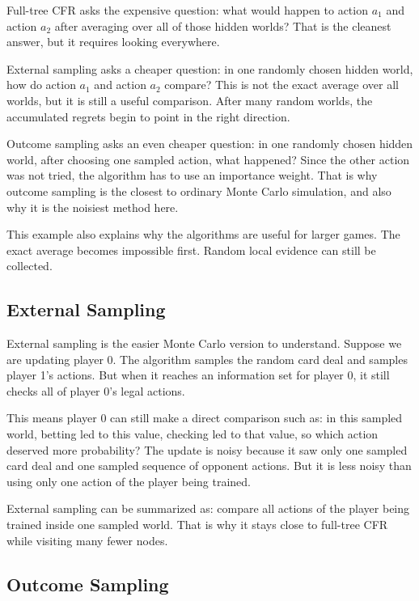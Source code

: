 \documentclass[11pt,reqno,twoside]{article}
\theoremstyle{myThm}
\theoremstyle{myRem}
\theoremstyle{myDef}
\numberwithin{equation}{section}
\begin{document}
Full-tree CFR asks the expensive question: what would happen to action
$a_1$ and action $a_2$ after averaging over all of those hidden worlds? That
is the cleanest answer, but it requires looking everywhere.

External sampling asks a cheaper question: in one randomly chosen hidden
world, how do action $a_1$ and action $a_2$ compare? This is not the exact
average over all worlds, but it is still a useful comparison. After many
random worlds, the accumulated regrets begin to point in the right
direction.

Outcome sampling asks an even cheaper question: in one randomly chosen
hidden world, after choosing one sampled action, what happened? Since the
other action was not tried, the algorithm has to use an importance weight.
That is why outcome sampling is the closest to ordinary Monte Carlo
simulation, and also why it is the noisiest method here.

This example also explains why the algorithms are useful for larger games.
The exact average becomes impossible first. Random local evidence can
still be collected.

\subsection{External Sampling}

External sampling is the easier Monte Carlo version to understand. Suppose
we are updating player 0. The algorithm samples the random card deal and
samples player 1's actions. But when it reaches an information set for
player 0, it still checks all of player 0's legal actions.

This means player 0 can still make a direct comparison such as: in this
sampled world, betting led to this value, checking led to that value, so
which action deserved more probability? The update is noisy because it
saw only one sampled card deal and one sampled sequence of opponent
actions. But it is less noisy than using only one action of the player
being trained.

External sampling can be summarized as: compare all actions of the player
being trained inside one sampled world. That is why it stays close to
full-tree CFR while visiting many fewer nodes.

\subsection{Outcome Sampling}
\end{document}
